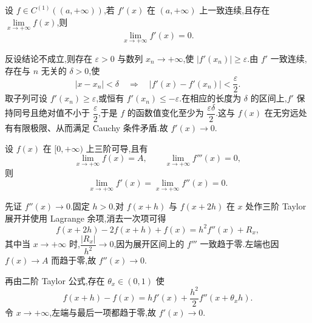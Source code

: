 \begin{example}[\markstar]
    设 $f\in C^{(1)}((a,+\infty))$,若 $f'(x)$ 在 $(a,+\infty)$ 上一致连续,且存在 $\displaystyle\lim\limits_{x\to+\infty}f(x)$,则
    \[
        \lim\limits_{x\to+\infty}f'(x)=0.
    \]
\end{example}
\exampleblank

\begin{solution}
    反设结论不成立,则存在 $\varepsilon>0$ 与数列 $x_n\to+\infty$,使 $|f'(x_n)|\geq\varepsilon$.由 $f'$ 一致连续,存在与 $n$ 无关的 $\delta>0$,使
    \[
        |x-x_n|<\delta
        \quad\Longrightarrow\quad
        |f'(x)-f'(x_n)|<\dfrac{\varepsilon}{2}.
    \]
    取子列可设 $f'(x_n)\geq\varepsilon$,或恒有 $f'(x_n)\leq-\varepsilon$.在相应的长度为 $\delta$ 的区间上,$f'$ 保持同号且绝对值不小于 $\dfrac{\varepsilon}{2}$,于是 $f$ 的函数值变化至少为 $\dfrac{\varepsilon\delta}{2}$.这与 $f(x)$ 在无穷远处有有限极限、从而满足 Cauchy 条件矛盾.故 $f'(x)\to0$.
\end{solution}

\begin{example}[\markstar]
    设 $f(x)$ 在 $\lbrack 0,+\infty)$ 上三阶可导,且有
    \[
        \lim\limits_{x\to+\infty}f(x)=A,
        \qquad
        \lim\limits_{x\to+\infty}f'''(x)=0,
    \]
    则
    \[
        \lim\limits_{x\to+\infty}f'(x)
        =\lim\limits_{x\to+\infty}f''(x)=0.
    \]
\end{example}
\exampleblank

\begin{solution}
    先证 $f''(x)\to0$.固定 $h>0$.对 $f(x+h)$ 与 $f(x+2h)$ 在 $x$ 处作三阶 Taylor 展开并使用 Lagrange 余项,消去一次项可得
    \[
        f(x+2h)-2f(x+h)+f(x)
        =h^2f''(x)+R_x,
    \]
    其中当 $x\to+\infty$ 时,$\dfrac{|R_x|}{h^2}\to0$,因为展开区间上的 $f'''$ 一致趋于零.左端也因 $f(x)\to A$ 而趋于零,故 $f''(x)\to0$.

    再由二阶 Taylor 公式,存在 $\theta_x\in(0,1)$ 使
    \[
        f(x+h)-f(x)
        =hf'(x)+\dfrac{h^2}{2}f''(x+\theta_xh).
    \]
    令 $x\to+\infty$,左端与最后一项都趋于零,故 $f'(x)\to0$.
\end{solution}

